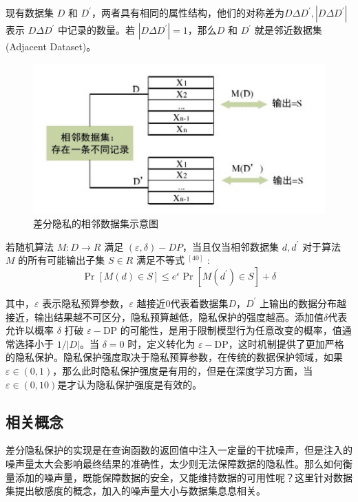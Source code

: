 \begin{define}[邻近数据集]\label{邻近数据集}
现有数据集 $D$ 和 $D^{\prime}$，两者具有相同的属性结构，他们的对称差为$D \Delta D^{\prime},\left|D \Delta D^{\prime}\right|$ 表示 $D \Delta D^{\prime}$ 中记录的数量。若 $\left|D \Delta D^{\prime}\right|=1$，那么$D$ 和 $D^{\prime}$ 就是邻近数据集 (Adjacent Dataset)。
\end{define}

\begin{figure}[!hbt]
\centering
	\includegraphics[scale=0.7]{fig2/C2/相邻数据集示意图}%
	\caption{差分隐私的相邻数据集示意图}
	\label{fig:相邻数据集示意图}	
\end{figure}

\begin{define}[差分隐私成立条件]\label{差分隐私成立条件}

若随机算法 $M: D \rightarrow R$ 满足 $(\varepsilon, \delta)-D P$，当且仅当相邻数据集 $d, d^{\prime}$ 对于算法 $M$ 的所有可能输出子集 $S \in R$ 满足不等式 $^{[40]}$ :
$$
\operatorname{Pr}[M(d) \in S] \leq e^{\varepsilon} \operatorname{Pr}\left[M\left(d^{\prime}\right) \in S\right]+\delta
$$
\end{define}
其中，$\varepsilon$ 表示隐私预算参数，$\varepsilon$ 越接近0代表着数据集$D$，$D^{\prime}$ 上输出的数据分布越接近，输出结果越不可区分，隐私预算越低，隐私保护的强度越高。添加值$\delta$代表允许以概率 $\delta$ 打破 $\varepsilon-\mathrm{DP}$ 的可能性，是用于限制模型行为任意改变的概率，值通常选择小于 $1 /|D|$。当 $\delta=0$ 时，定义转化为 $\varepsilon-\mathrm{DP}$，这时机制提供了更加严格的隐私保护。隐私保护强度取决于隐私预算参数，在传统的数据保护领域，如果$\varepsilon \in(0,1)$，那么此时隐私保护强度是有用的，但是在深度学习方面，当$\varepsilon \in(0,10)$是才认为隐私保护强度是有效的。


\subsection{相关概念}
差分隐私保护的实现是在查询函数的返回值中注入一定量的干扰噪声，但是注入的噪声量太大会影响最终结果的准确性，太少则无法保障数据的隐私性。那么如何衡量添加的噪声量，既能保障数据的安全，又能维持数据的可用性呢？这里针对数据集提出敏感度的概念，加入的噪声量大小与数据集息息相关。

